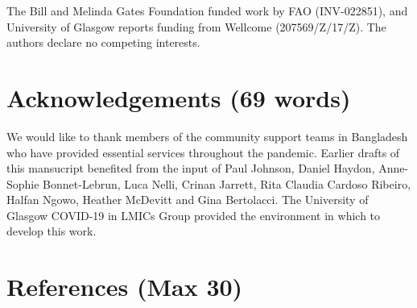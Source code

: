 \documentclass[]{elsarticle} %
\begin{document}
The Bill and Melinda Gates Foundation funded work by FAO (INV-022851), and University of Glasgow reports funding from Wellcome (207569/Z/17/Z).
The authors declare no competing interests.

\hypertarget{acknowledgements-69-words}{%
\section{Acknowledgements (69 words)}\label{acknowledgements-69-words}}

We would like to thank members of the community support teams in Bangladesh who have provided essential services throughout the pandemic.
Earlier drafts of this mansucript benefited from the input of Paul Johnson, Daniel Haydon, Anne-Sophie Bonnet-Lebrun, Luca Nelli, Crinan Jarrett, Rita Claudia Cardoso Ribeiro, Halfan Ngowo, Heather McDevitt and Gina Bertolacci.
The University of Glasgow COVID-19 in LMICs Group provided the environment in which to develop this work.

\hypertarget{references-max-30}{%
\section*{References (Max 30)}\label{references-max-30}}
\end{document}
